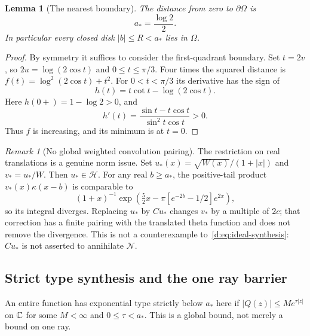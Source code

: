 \documentclass[11pt,a4paper]{article}
\numberwithin{equation}{section}
\newtheorem{lemma}[theorem]{Lemma}
\theoremstyle{definition}\newtheorem{definition}[theorem]{Definition}
\theoremstyle{remark}\newtheorem{remark}[theorem]{Remark}
\newcommand{\Hh}{\mathcal H}\newcommand{\Hw}{\mathcal H}
\newcommand{\Nn}{\mathcal N}\newcommand{\Ii}{\mathcal I}\newcommand{\Zz}{\mathcal Z}
\begin{document}
\begin{lemma}[The nearest boundary]\label{d:lem:radius}
The distance from zero to $\partial\Omega$ is
\begin{equation}\label{d:eq:a-star}
 a_*=\frac{\log2}{2}.
\end{equation}
In particular every closed disk $|b|\le R<a_*$ lies in $\Omega$.
\end{lemma}
\begin{proof}
By symmetry it suffices to consider the first-quadrant boundary. Set $t=2v$, so $2u=\log(2\cos t)$ and $0\le t\le\pi/3$. Four times the squared distance is
$f(t)=\log^2(2\cos t)+t^2$. For $0<t<\pi/3$ its derivative has the sign of
\[
 h(t)=t\cot t-\log(2\cos t).
\]
Here $h(0+)=1-\log2>0$, and
\[
 h'(t)=\frac{\sin t-t\cos t}{\sin^2t\cos t}>0.
\]
Thus $f$ is increasing, and its minimum is at $t=0$.
\end{proof}

\begin{remark}[No global weighted convolution pairing]\label{d:rem:pairing}
The restriction on real translations is a genuine norm issue. Set
$u_*(x)=\sqrt{W(x)}/(1+|x|)$ and $v_*=u_*/W$. Then $u_*\in\Hh$. For any real $b\ge a_*$, the positive-tail product $v_*(x)\kappa(x-b)$ is comparable to
\[
 (1+x)^{-1}\exp\!\left(\tfrac52x-\pi[e^{-2b}-1/2]e^{2x}\right),
\]
so its integral diverges. Replacing $u_*$ by $Cu_*$ changes $v_*$ by a multiple of $2c$; that correction has a finite pairing with the translated theta function and does not remove the divergence. This is not a counterexample to~\eqref{d:eq:ideal-synthesis}: $Cu_*$ is not asserted to annihilate $\Nn$.
\end{remark}

\subsection{Strict type synthesis and the one ray barrier}\label{d:sec:type}

An entire function has exponential type strictly below $a_*$ here if
$|Q(z)|\le M e^{\tau|z|}$ on $\mathbb C$ for some $M<\infty$ and $0\le\tau<a_*$. This is a global bound, not merely a bound on one ray.
\end{document}
